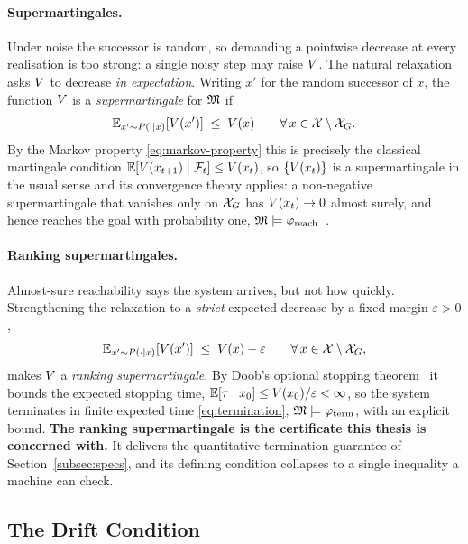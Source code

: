 \paragraph{Supermartingales.} Under noise the successor is random, so demanding a
pointwise decrease at every realisation is too strong: a single noisy step may
raise $V$. The natural relaxation asks $V$ to decrease \emph{in
expectation}. Writing $x'$ for the random successor of $x$, the function $V$
is a \emph{supermartingale} for $\mathfrak{M}$ if
%
\begin{equation}
    \mathbb{E}_{x' \sim P(\cdot \mid x)}[V(x')] \;\leq\; V(x)
    \qquad \forall\, x \in \mathcal{X} \setminus \mathcal{X}_G .
    \label{eq:supermartingale-condition}
\end{equation}
%
By the Markov property \eqref{eq:markov-property} this is precisely the classical
martingale condition $\mathbb{E}[V(x_{t+1}) \mid \mathcal{F}_t] \leq V(x_t)$, so
$\{V(x_t)\}$ is a supermartingale in the usual sense and its convergence
theory applies: a non-negative supermartingale that vanishes only on $\mathcal{X}_G$ has
$V(x_t) \to 0$ almost surely, and hence reaches the goal with probability
one, $\mathfrak{M} \models \varphi_{\mathrm{reach}}$~\cite{williams1991probability}.

\paragraph{Ranking supermartingales.} Almost-sure reachability says the system
arrives, but not how quickly. Strengthening the relaxation to a \emph{strict}
expected decrease by a fixed margin $\varepsilon > 0$,
%
\begin{equation}
    \mathbb{E}_{x' \sim P(\cdot \mid x)}[V(x')] \;\leq\; V(x) - \varepsilon
    \qquad \forall\, x \in \mathcal{X} \setminus \mathcal{X}_G ,
    \label{eq:ranking-supermartingale}
\end{equation}
%
makes $V$ a \emph{ranking supermartingale}. By Doob's optional stopping
theorem~\cite{williams1991probability} it bounds the expected stopping time,
$\mathbb{E}[\tau \mid x_0] \leq V(x_0)/\varepsilon < \infty$, so the system
terminates in finite expected time \eqref{eq:termination},
$\mathfrak{M} \models \varphi_{\mathrm{term}}$, with an explicit bound. \textbf{The ranking supermartingale is the certificate this
thesis is concerned with.} It delivers the quantitative termination guarantee of
Section~\ref{subsec:specs}, and its defining condition collapses to a single inequality a machine can check.

\subsection{The Drift Condition}
\label{subsec:drift}

